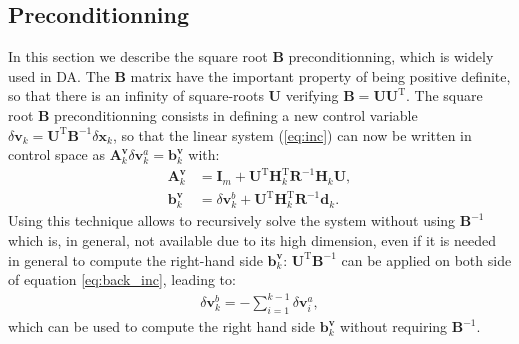 \documentclass[npg, manuscript]{copernicus}
\begin{document}
\subsection{Preconditionning}
In this section we describe the square root $\mathbf{B}$ preconditionning, which is widely used in DA. 
The $\mathbf{B}$ matrix have the important property of being positive definite, so that there is an infinity of square-roots $\mathbf{U}$ verifying $\mathbf{B} = \mathbf{U} \mathbf{U}^\mathrm{T}$. The square root $\mathbf{B}$ preconditionning consists in defining a new control variable $\delta \mathbf{v}_k = \mathbf{U}^\mathrm{T} \mathbf{B}^{-1} \delta \mathbf{x}_k$, so that the linear system (\ref{eq:inc}) can now be written in control space as $\mathbf{A}^\mathbf{v}_k \delta \mathbf{v}^a_k = \mathbf{b}^\mathbf{v}_k$ with:
\begin{align}
\mathbf{A}^\mathbf{v}_k & = \mathbf{I}_m + \mathbf{U}^\mathrm{T} \mathbf{H}_k^\mathrm{T} \mathbf{R}^{-1} \mathbf{H}_k \mathbf{U},\\
\mathbf{b}^\mathbf{v}_k & = \delta \mathbf{v}^b_k + \mathbf{U}^\mathrm{T} \mathbf{H}_k^\mathrm{T} \mathbf{R}^{-1} \mathbf{d}_k.
\end{align}
Using this technique allows to recursively solve the system without using $\mathbf{B}^{-1}$ which is, in general, not available due to its high dimension, even if it is needed in general to compute the right-hand side $\mathbf{b}^\mathbf{v}_k$: $\mathbf{U}^\mathrm{T} \mathbf{B}^{-1}$ can be applied on both side of equation \eqref{eq:back_inc}, leading to:
\begin{align}
\label{eq:back_inc_U}
\delta \mathbf{v}^b_k = - \sum_{i=1}^{k-1} \delta \mathbf{v}^a_i,
\end{align}
which can be used to compute the right hand side $\mathbf{b}^\mathbf{v}_k$ without requiring $\mathbf{B}^{-1}$.
\end{document}
